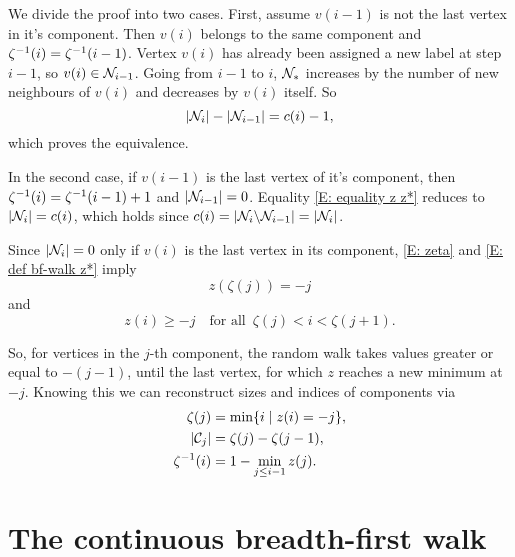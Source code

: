 We divide the proof into two cases.
First, assume $v(i-1)$ is not the last vertex in it's component.
Then $v(i)$ belongs to the same component and
$\zeta^{-1}(i) = \zeta^{-1}(i-1)$.
Vertex $v(i)$ has already been assigned a new label at step $i-1$,
so $v(i) \in \mathcal{N}_{i-1}$.
Going from $i-1$ to $i$,
$\mathcal{N}_{*}$ increases by the number of new neighbours of $v(i)$
and decreases by $v(i)$ itself.
So
\begin{equation}
|\mathcal{N}_{i}| - |\mathcal{N}_{i-1}| = c(i) - 1,
\end{equation}
which proves the equivalence.

In the second case, if $v(i-1)$ is the last vertex of it's component,
then $\zeta^{-1}(i) = \zeta^{-1}(i-1) + 1$
and $|\mathcal{N}_{i-1}| = 0$.
Equality \eqref{E: equality z z*} reduces to
$ |\mathcal{N}_{i}| = c(i)$,
which holds since
$c(i) = |\mathcal{N}_{i} \backslash \mathcal{N}_{i-1}| = |\mathcal{N}_{i}|$.

Since $|\mathcal{N}_{i}| = 0$ only if $v(i)$ is the last vertex in its component,
\eqref{E: zeta} and \eqref{E: def bf-walk z*} imply
\begin{equation}
	z(\zeta (j)) = -j
\end{equation}
and 
\begin{equation}
	z(i) \geq -j \quad \text{for all} \enspace \zeta(j) < i < \zeta(j+1).
\end{equation}

So, for vertices in the $j$-th component,
the random walk takes values greater or equal to $-(j-1)$,
until the last vertex, for which $z$ reaches a new minimum at $-j$.
Knowing this we can reconstruct sizes and indices of components via
\begin{align}
\zeta(j) &= \min \{ i \; | \; z(i) = -j \}, \label{E: zeta(j) = min(i)} \\
|\mathcal{C}_{j}| &= \zeta(j) - \zeta(j-1), \label{E: C(j) = zeta - zeta} \\
\zeta^{-1}(i) &= 1 - \min_{j \leq i-1}z(j). \label{E: zeta-1(i) = 1 - min(j)}
\end{align}


\section{The continuous breadth-first walk}

